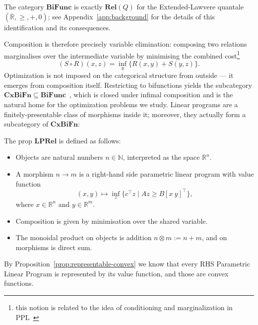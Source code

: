 \begin{remark}
	The category $\mathbf{BiFunc}$ is exactly $\mathbf{Rel}(Q)$ for the
	Extended-Lawvere quantale $(\overline{\mathbb{R}}, \ge, +, 0)$; see
	Appendix~\ref{app:background} for the details of this identification
	and its consequences.
\end{remark}

Composition is therefore precisely variable elimination: composing two relations marginalises over the intermediate variable by minimising the combined cost\footnote{this notion is related to the idea of conditioning and marginalization in PPL~\cite{stein2024gqa,vandemeent2021introductionprobabilisticprogramming}}
\[
	(S\circ R)(x,z)=\inf_y \{R(x,y)+S(y,z)\}.
\]
Optimization is not imposed on the categorical structure from outside --- it emerges from composition itself. Restricting to bifunctions yields the subcategory $\mathbf{CxBiFn} \subseteq \mathbf{BiFunc}$~\cite{rockafellar1970convex}, which is closed under infimal composition and is the natural home for the optimization problems we study. Linear programs are a finitely-presentable class of morphisms inside it; moreover, they actually form a subcategory of $\mathbf{CxBiFn}$:

\begin{definition}
	The prop $\mathbf{LPRel}$ is defined as follows:
	\begin{itemize}
		\item Objects are natural numbers $n \in \mathbb{N}$, interpreted
		      as the space $\mathbb{R}^n$.
		\item A morphism $n \to m$ is a right-hand side parametric linear
		      program with value function
		      \[
			      (x,y) \mapsto \inf_z \{ c^\top z \mid Az \ge B[x\ y]^\top \},
		      \]
		      where $x \in \mathbb{R}^n$ and $y \in \mathbb{R}^m$.
		\item Composition is given by minimisation over the shared variable.
		\item The monoidal product on objects is addition $n \otimes m := n+m$,
		      and on morphisms is direct sum.
	\end{itemize}
\end{definition}

By Proposition~\ref{prop:representable-convex} we know that every RHS Parametric Linear Program is represented by its value function, and those are convex functions.
